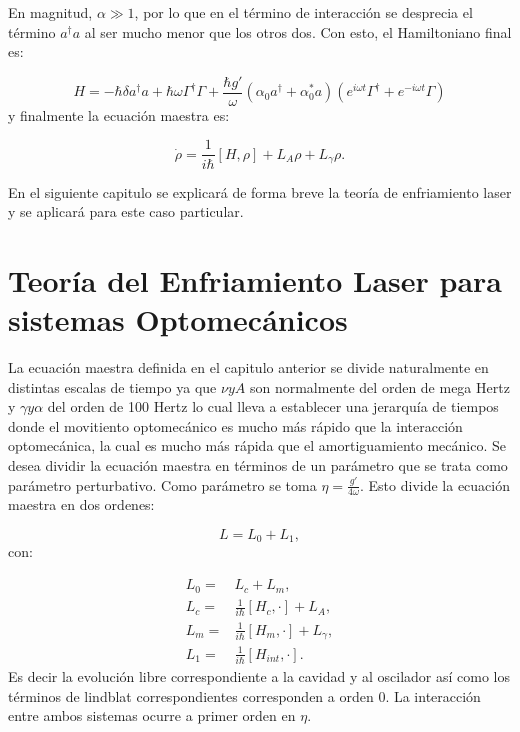 \documentclass[a4paper,10pt]{report}
\begin{document}
En magnitud, $\alpha \gg 1$, por lo que en el término de interacción se desprecia el término $a^\dagger a$ al ser mucho menor que los otros dos. Con esto, el Hamiltoniano final es:

\begin{equation}
H = -\hbar \delta a^{\dagger}a +\hbar\omega\Gamma^{\dagger}\Gamma +\frac{\hbar g'}{\omega}(\alpha_0 a^{\dagger}+\alpha^*_0 a)(e^{i\omega t}\Gamma^{\dagger}+e^{-i\omega t}\Gamma)
\end{equation} y finalmente la ecuación maestra es:

\begin{equation}\label{LCMasterEq}
\dot{\rho} = \frac{1}{i\hbar}[H,\rho] +L_A\rho + L_\gamma \rho.
\end{equation}

En el siguiente capitulo se explicará de forma breve la teoría de enfriamiento laser y se aplicará para este caso particular.

\chapter{Teoría del Enfriamiento Laser para sistemas Optomecánicos}

La ecuación maestra definida en el capitulo anterior se divide naturalmente en distintas escalas de tiempo ya que $\nu y A$ son normalmente del orden de mega Hertz y $\gamma y \alpha$ del orden de 100 Hertz lo cual lleva a establecer una jerarquía de tiempos donde el movitiento optomecánico es mucho más rápido que la interacción optomecánica, la cual es mucho más rápida que el amortiguamiento mecánico. Se desea dividir la ecuación maestra en términos de un parámetro que se trata como parámetro perturbativo. Como parámetro se toma $\eta=\frac{g'}{4\omega}$. Esto divide la ecuación maestra en dos ordenes:

\begin{equation}
L = L_0 + L_1,
\end{equation} con:

\begin{align*}
L_0 =& L_c + L_m,\\
L_c =& \frac{1}{i\hbar}[H_c,\cdot] + L_A,\\
L_m =& \frac{1}{i\hbar}[H_m,\cdot] + L_\gamma,\\
L_1 =& \frac{1}{i\hbar}[H_{int},\cdot].
\end{align*} Es decir la evolución libre correspondiente a la cavidad y al oscilador así como los términos de lindblat correspondientes corresponden a orden 0. La interacción entre ambos sistemas ocurre a primer orden en $\eta$.
\end{document}
